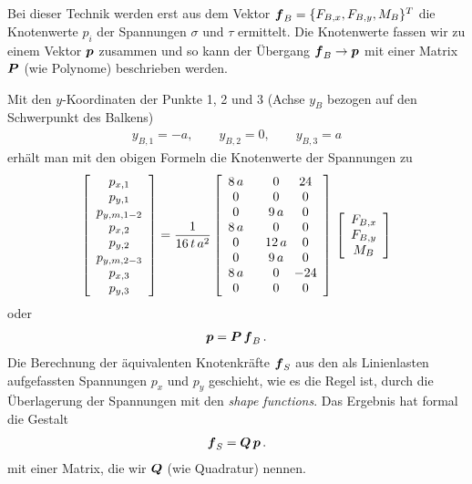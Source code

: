 Bei dieser Technik werden erst aus dem Vektor $\mbox{\boldmath $f$}_B = \{F_{B,x}, F_{B,y}, M_B\}^T$ die Knotenwerte $p_i$ der Spannungen $\sigma$ und $\tau$ ermittelt. Die Knotenwerte fassen wir zu einem  Vektor $\mbox{\boldmath $p$} $ zusammen und so kann der \"{U}bergang $\mbox{\boldmath $f$}_B \to \mbox{\boldmath $p$}$ mit einer Matrix $\mbox{\boldmath $P$}$ (wie Polynome) beschrieben werden.

Mit den $y$-Koordinaten der Punkte 1, 2 und 3 (Achse $y_B$ bezogen auf den Schwerpunkt des Balkens)
\begin{align}
y_{B,1} = - a, \qquad y_{B,2} = 0, \qquad y_{B,3} = a
\end{align}
erh\"{a}lt man mit den obigen Formeln die Knotenwerte der Spannungen zu
\begin{align}
\left[\barr{c} p_{x,1} \\ p_{y,1}  \\p_{y,m,1-2} \\ p_{x,2} \\ p_{y,2} \\ p_{y,m,2-3} \\  p_{x,3} \\  p_{y,3}\earr \right] = \frac{ 1}{16\,t\,a^2}\left[\barr{c @{\hspace{6mm}} c @{\hspace{2mm}} c} 8\,a &0 & 24 \\ 0 & 0 & 0 \\ 0 & 9\,a & 0 \\ 8\,a &0 & 0 \\ 0 &12\,a &0 \\ 0 & 9\,a & 0 \\ 8\,a &0 & -24 \\ 0 & 0 &0  \earr \right]\,\left[\barr{c} F_{B,x} \\ F_{B,y} \\ M_B \earr \right]
\end{align}
oder
\begin{align}\label{Eq26}
\mbox{\boldmath $p$} = \mbox{\boldmath $P$}\,\mbox{\boldmath $f$}_B\,.
\end{align}
Die Berechnung der \"{a}quivalenten Knotenkr\"{a}fte $\mbox{\boldmath $f$}_S$ aus den als Linienlasten aufgefassten Spannungen $p_x$ und $p_y$ geschieht, wie es die Regel ist, durch die \"{U}berlagerung der Spannungen mit den {\em shape functions\/}. Das Ergebnis hat formal die Gestalt
\begin{align}
\mbox{\boldmath $f$}_S = \mbox{\boldmath $Q$}\,\mbox{\boldmath $p$}\,.
\end{align}
mit einer Matrix, die wir $\mbox{\boldmath $Q$}$ (wie Quadratur) nennen.

